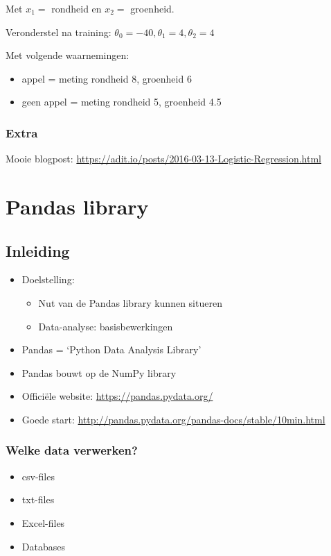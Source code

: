 \documentclass{article}
\begin{document}
Met $x_1 =$ rondheid en $x_2 =$ groenheid.

Veronderstel na training: $\theta_0 = -40, \theta_1 = 4, \theta_2 = 4$

Met volgende waarnemingen: 

\begin{itemize}
    \item appel = meting rondheid 8, groenheid 6
    \item geen appel = meting rondheid 5, groenheid 4.5
\end{itemize}

\subsubsection{Extra}

Mooie blogpost: \url{https://adit.io/posts/2016-03-13-Logistic-Regression.html}


\section{Pandas library}

\subsection{Inleiding}

\begin{itemize}
    \item Doelstelling:
    \begin{itemize}
        \item Nut van de Pandas library kunnen situeren
        \item Data-analyse: basisbewerkingen
    \end{itemize}
    \item Pandas = `Python Data Analysis Library'
    \item Pandas bouwt op de NumPy library
    \item Officiële website: \url{https://pandas.pydata.org/}
    \item Goede start: \url{http://pandas.pydata.org/pandas-docs/stable/10min.html} 
\end{itemize}

\subsubsection{Welke data verwerken?}

\begin{itemize}
    \item csv-files
    \item txt-files
    \item Excel-files
    \item Databases
\end{itemize}
\end{document}
